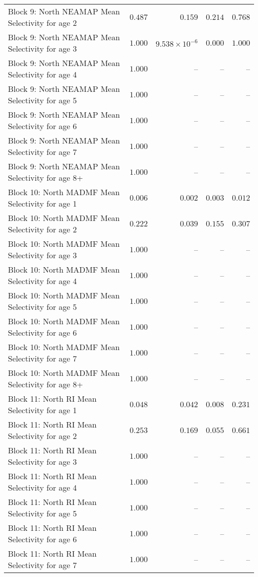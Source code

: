 \documentclass[
]{article}
\begin{document}
\begin{landscape}
\begin{longtable}[t]{lrrrr}
Block 9: North NEAMAP Mean Selectivity for age 2 & $0.487$ & $0.159$ & $0.214$ & $0.768$\\
Block 9: North NEAMAP Mean Selectivity for age 3 & $1.000$ & $9.538\times 10^{-6}$ & $0.000$ & $1.000$\\
Block 9: North NEAMAP Mean Selectivity for age 4 & $1.000$ & -- & -- & --\\
Block 9: North NEAMAP Mean Selectivity for age 5 & $1.000$ & -- & -- & --\\
\addlinespace
Block 9: North NEAMAP Mean Selectivity for age 6 & $1.000$ & -- & -- & --\\
Block 9: North NEAMAP Mean Selectivity for age 7 & $1.000$ & -- & -- & --\\
Block 9: North NEAMAP Mean Selectivity for age 8+ & $1.000$ & -- & -- & --\\
Block 10: North MADMF Mean Selectivity for age 1 & $0.006$ & $0.002$ & $0.003$ & $0.012$\\
Block 10: North MADMF Mean Selectivity for age 2 & $0.222$ & $0.039$ & $0.155$ & $0.307$\\
\addlinespace
Block 10: North MADMF Mean Selectivity for age 3 & $1.000$ & -- & -- & --\\
Block 10: North MADMF Mean Selectivity for age 4 & $1.000$ & -- & -- & --\\
Block 10: North MADMF Mean Selectivity for age 5 & $1.000$ & -- & -- & --\\
Block 10: North MADMF Mean Selectivity for age 6 & $1.000$ & -- & -- & --\\
Block 10: North MADMF Mean Selectivity for age 7 & $1.000$ & -- & -- & --\\
\addlinespace
Block 10: North MADMF Mean Selectivity for age 8+ & $1.000$ & -- & -- & --\\
Block 11: North RI Mean Selectivity for age 1 & $0.048$ & $0.042$ & $0.008$ & $0.231$\\
Block 11: North RI Mean Selectivity for age 2 & $0.253$ & $0.169$ & $0.055$ & $0.661$\\
Block 11: North RI Mean Selectivity for age 3 & $1.000$ & -- & -- & --\\
Block 11: North RI Mean Selectivity for age 4 & $1.000$ & -- & -- & --\\
\addlinespace
Block 11: North RI Mean Selectivity for age 5 & $1.000$ & -- & -- & --\\
Block 11: North RI Mean Selectivity for age 6 & $1.000$ & -- & -- & --\\
Block 11: North RI Mean Selectivity for age 7 & $1.000$ & -- & -- & --\\

\end{longtable}
\end{landscape}
\end{document}
